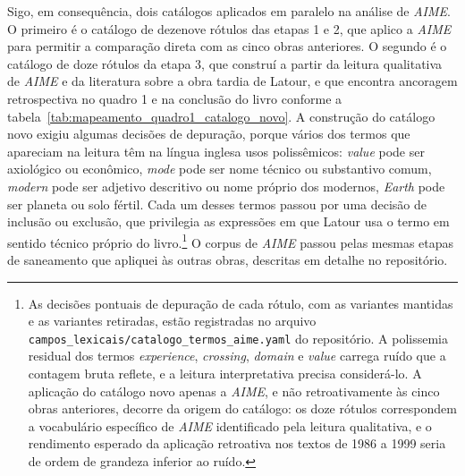 Sigo, em consequência, dois catálogos aplicados em paralelo na análise de \textit{AIME}. O primeiro é o catálogo de dezenove rótulos das etapas 1 e 2, que aplico a \textit{AIME} para permitir a comparação direta com as cinco obras anteriores. O segundo é o catálogo de doze rótulos da etapa 3, que construí a partir da leitura qualitativa de \textit{AIME} e da literatura sobre a obra tardia de Latour, e que encontra ancoragem retrospectiva no quadro 1 e na conclusão do livro conforme a tabela~\ref{tab:mapeamento_quadro1_catalogo_novo}. A construção do catálogo novo exigiu algumas decisões de depuração, porque vários dos termos que apareciam na leitura têm na língua inglesa usos polissêmicos: \emph{value} pode ser axiológico ou econômico, \emph{mode} pode ser nome técnico ou substantivo comum, \emph{modern} pode ser adjetivo descritivo ou nome próprio dos modernos, \emph{Earth} pode ser planeta ou solo fértil. Cada um desses termos passou por uma decisão de inclusão ou exclusão, que privilegia as expressões em que Latour usa o termo em sentido técnico próprio do livro.\footnote{As decisões pontuais de depuração de cada rótulo, com as variantes mantidas e as variantes retiradas, estão registradas no arquivo \texttt{campos\_lexicais/catalogo\_termos\_aime.yaml} do repositório. A polissemia residual dos termos \emph{experience}, \emph{crossing}, \emph{domain} e \emph{value} carrega ruído que a contagem bruta reflete, e a leitura interpretativa precisa considerá-lo. A aplicação do catálogo novo apenas a \textit{AIME}, e não retroativamente às cinco obras anteriores, decorre da origem do catálogo: os doze rótulos correspondem a vocabulário específico de \textit{AIME} identificado pela leitura qualitativa, e o rendimento esperado da aplicação retroativa nos textos de 1986 a 1999 seria de ordem de grandeza inferior ao ruído.} O corpus de \textit{AIME} passou pelas mesmas etapas de saneamento que apliquei às outras obras, descritas em detalhe no repositório.

